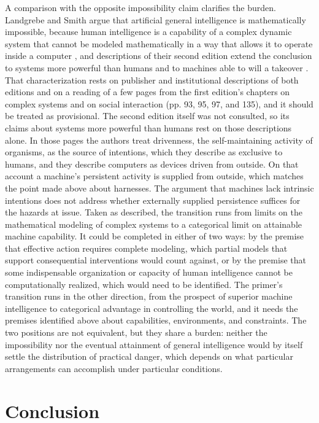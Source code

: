 \documentclass[11pt]{article}
\begin{document}
A comparison with the opposite impossibility claim clarifies the burden. Landgrebe and Smith argue that artificial general intelligence is mathematically impossible, because human intelligence is a capability of a complex dynamic system that cannot be modeled mathematically in a way that allows it to operate inside a computer \citeyearpar{landgrebe2023}, and descriptions of their second edition extend the conclusion to systems more powerful than humans and to machines able to will a takeover \citeyearpar{landgrebe2025}. That characterization rests on publisher and institutional descriptions of both editions and on a reading of a few pages from the first edition's chapters on complex systems and on social interaction (pp. 93, 95, 97, and 135), and it should be treated as provisional. The second edition itself was not consulted, so its claims about systems more powerful than humans rest on those descriptions alone. In those pages the authors treat drivenness, the self-maintaining activity of organisms, as the source of intentions, which they describe as exclusive to humans, and they describe computers as devices driven from outside. On that account a machine's persistent activity is supplied from outside, which matches the point made above about harnesses. The argument that machines lack intrinsic intentions does not address whether externally supplied persistence suffices for the hazards at issue. Taken as described, the transition runs from limits on the mathematical modeling of complex systems to a categorical limit on attainable machine capability. It could be completed in either of two ways: by the premise that effective action requires complete modeling, which partial models that support consequential interventions would count against, or by the premise that some indispensable organization or capacity of human intelligence cannot be computationally realized, which would need to be identified. The primer's transition runs in the other direction, from the prospect of superior machine intelligence to categorical advantage in controlling the world, and it needs the premises identified above about capabilities, environments, and constraints. The two positions are not equivalent, but they share a burden: neither the impossibility nor the eventual attainment of general intelligence would by itself settle the distribution of practical danger, which depends on what particular arrangements can accomplish under particular conditions.

\section{Conclusion}
\end{document}
